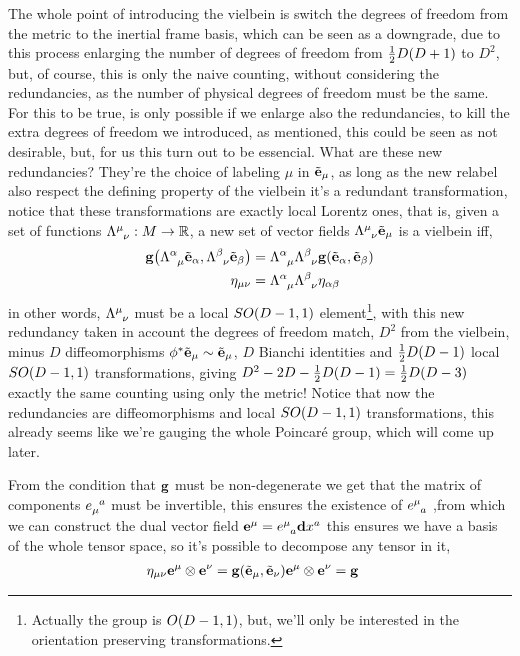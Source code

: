 The whole point of introducing the vielbein is switch the degrees of freedom from the 
metric to the inertial frame basis, which can be seen as a downgrade, due to this process enlarging the number of degrees of freedom from $\frac12D\qty(D+1)$ 
to $D^2$, but, of course, this is only the naive counting, without considering the redundancies, as the number of physical degrees of freedom must be the same. 
For this to be true, is only possible if we enlarge also the redundancies, to kill the extra degrees of freedom we introduced, as mentioned, this could be seen as 
not desirable, but, for us this turn out to be essencial. What are these new redundancies? They're the choice of labeling $\mu$ in $\tilde{\vb e}_\mu$, as long as the 
new relabel also respect the defining property of the vielbein it's a redundant transformation, notice that these transformations are exactly local Lorentz ones, that is, 
given a set of functions $\tensor{\Lambda}{^\mu_\nu}:M\rightarrow\mathbb R$, a new set of vector fields $\tensor{\Lambda}{^\mu_\nu}\tilde{\vb e}_\mu$ is a vielbein iff, 
\begin{align*}
    \vb g\qty(\tensor{\Lambda}{^\alpha_\mu}\tilde{\vb e}_\alpha,\tensor{\Lambda}{^\beta_\nu}\tilde{\vb e}_\beta)&=\tensor{\Lambda}{^\alpha_\mu}\tensor{\Lambda}{^\beta_\nu}\vb g\qty(\tilde{\vb e}_\alpha,\tilde{\vb e}_\beta)\\
    \eta_{\mu\nu}&=\tensor{\Lambda}{^\alpha_\mu}\tensor{\Lambda}{^\beta_\nu}\eta_{\alpha\beta}
\end{align*}
in other words, $\tensor{\Lambda}{^\mu_\nu}$ must be a local $SO\qty(D-1,1)$ element\footnote{Actually the group is $O\qty(D-1,1)$, but, we'll only be interested in the orientation preserving transformations.}, with this new redundancy taken in account the degrees of freedom match, $D^2$ 
from the vielbein, minus $D$ diffeomorphisms $\phi^\ast\tilde{\vb e}_\mu\sim\tilde{\vb e}_\mu$, $D$ Bianchi identities and $\frac12D\qty(D-1)$ local $SO\qty(D-1,1)$ transformations, giving $D^2-2D-\frac12D\qty(D-1)=\frac12D\qty(D-3)$ exactly 
the same counting using only the metric! Notice that now the redundancies are diffeomorphisms and local $SO\qty(D-1,1)$ transformations, this already seems like we're gauging the whole Poincaré group, which will come up later.

From the condition that $\vb g$ must be non-degenerate we get that the matrix of components $\tensor{e}{_\mu^a}$ must be invertible, this ensures 
the existence of $\tensor{e}{^\mu_a}$ ,from which we can construct the dual vector field $\vb e^\mu=\tensor{e}{^\mu_a}\vb d{x^a}$ this ensures 
we have a basis of the whole tensor space, so it's possible to decompose any tensor in it,
\begin{align*}
    \eta_{\mu\nu}\vb e^\mu\otimes\vb e^\nu&=\vb g\qty(\tilde{\vb e}_\mu,\tilde{\vb e}_\nu)\vb e^\mu\otimes\vb e^\nu=\vb g
\end{align*}


